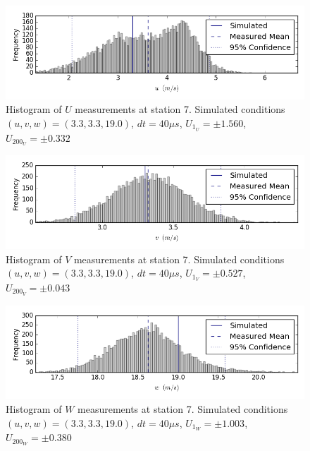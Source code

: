 \begin{figure}[H]
\centering
\includegraphics[width=6in]{figs/Ely_May28th07002/uncertainty_Ely_May28th07002_U}
\caption{Histogram of $U$ measurements at station 7. Simulated conditions $(u,v,w)=(3.3, 3.3, 19.0)$, $dt=40 \mu s$, $U_{1_{U}}=\pm 1.560$, $U_{200_{U}}=\pm 0.332$}
\label{fig:uncertainty_Ely_May28th07002_U}
\end{figure}


\begin{figure}[H]
\centering
\includegraphics[width=6in]{figs/Ely_May28th07002/uncertainty_Ely_May28th07002_V}
\caption{Histogram of $V$ measurements at station 7. Simulated conditions $(u,v,w)=(3.3, 3.3, 19.0)$, $dt=40 \mu s$, $U_{1_{V}}=\pm 0.527$, $U_{200_{V}}=\pm 0.043$}
\label{fig:uncertainty_Ely_May28th07002_V}
\end{figure}


\begin{figure}[H]
\centering
\includegraphics[width=6in]{figs/Ely_May28th07002/uncertainty_Ely_May28th07002_W}
\caption{Histogram of $W$ measurements at station 7. Simulated conditions $(u,v,w)=(3.3, 3.3, 19.0)$, $dt=40 \mu s$, $U_{1_{W}}=\pm 1.003$, $U_{200_{W}}=\pm 0.380$}
\label{fig:uncertainty_Ely_May28th07002_W}
\end{figure}


